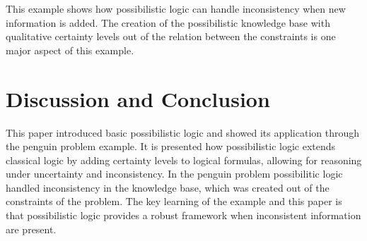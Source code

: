 \documentclass[seminar,english,m]{AIGpaper}
\begin{document}
This example shows how possibilistic logic can handle inconsistency when new information is added. The creation of the possibilistic knowledge base with qualitative certainty levels out of the relation between the constraints is one major aspect of this example.
\clearpage
\section{Discussion and Conclusion} \label{Conclusion}
This paper introduced basic possibilistic logic and showed its application through the penguin problem example. It is presented how possibilistic logic extends classical logic by adding certainty levels to logical formulas, allowing for reasoning under uncertainty and inconsistency. In the penguin problem possibilitic logic handled inconsistency in the knowledge base, which was created out of the constraints of the problem. The key learning of the example and this paper is that possibilistic logic provides a robust framework when inconsistent information are present.
\clearpage
\addreferences
{}
\end{document}
